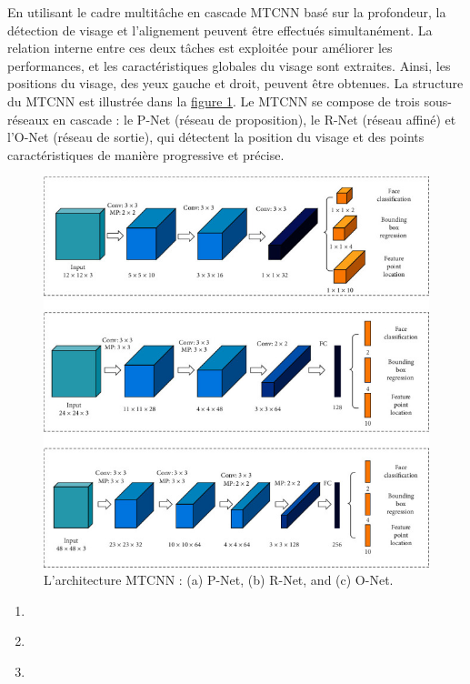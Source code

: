 En utilisant le cadre multitâche en cascade MTCNN basé sur la profondeur, la détection de visage et l’alignement peuvent être effectués simultanément. La relation interne entre ces deux tâches est exploitée pour améliorer les performances, et les caractéristiques globales du visage sont extraites. Ainsi, les positions du visage, des yeux gauche et droit, peuvent être obtenues. La structure du MTCNN est illustrée dans la \hyperlink{fig3} {figure 1}. Le MTCNN se compose de trois sous-réseaux en cascade : le P-Net (réseau de proposition), le R-Net (réseau affiné) et l’O-Net (réseau de sortie), qui détectent la position du visage et des points caractéristiques de manière progressive et précise.
\begin{figure}[H]
    \hypertarget{fig3}{}
    \centering
    \includegraphics{img/CIN2020-7251280.002.jpg}
    \caption{L'architecture MTCNN : (a) P-Net, (b) R-Net, and (c) O-Net.}
    \label{fig:enter-label}
\end{figure}
\begin{enumerate}
    \item \textbf{}\\
    \item \textbf{}\\
    \item \textbf{}\\
\end{enumerate}
